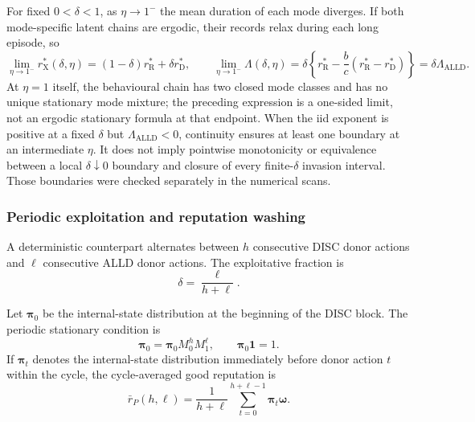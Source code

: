 \documentclass[fleqn,10pt]{wlscirep}
\begin{document}
For fixed $0<\delta<1$, as $\eta\to1^{-}$ the mean duration of each mode diverges. If both mode-specific latent chains are ergodic, their records relax during each long episode, so
\begin{equation}
\lim_{\eta\to1^-}r_{\mathrm X}^*(\delta,\eta)
=(1-\delta)r_{\mathrm R}^*+\delta r_{\mathrm D}^*,
\qquad
\lim_{\eta\to1^-}\Lambda(\delta,\eta)
=\delta\left\{r_{\mathrm R}^*-\frac bc(r_{\mathrm R}^*-r_{\mathrm D}^*)\right\}
=\delta\Lambda_{\mathrm{ALLD}}.
\label{eq:si-temporal-persistent-limit}
\end{equation}
At $\eta=1$ itself, the behavioural chain has two closed mode classes and has no unique stationary mode mixture; the preceding expression is a one-sided limit, not an ergodic stationary formula at that endpoint. When the iid exponent is positive at a fixed $\delta$ but $\Lambda_{\mathrm{ALLD}}<0$, continuity ensures at least one boundary at an intermediate $\eta$. It does not imply pointwise monotonicity or equivalence between a local $\delta\downarrow0$ boundary and closure of every finite-$\delta$ invasion interval. Those boundaries were checked separately in the numerical scans.

\subsubsection{Periodic exploitation and reputation washing}

A deterministic counterpart alternates between $h$ consecutive DISC donor actions and $\ell$ consecutive ALLD donor actions.
The exploitative fraction is
\begin{equation}
\delta
=
\frac{\ell}{h+\ell}.
\end{equation}

Let $\boldsymbol{\pi}_0$ be the internal-state distribution at the beginning of the DISC block.
The periodic stationary condition is
\begin{equation}
\boldsymbol{\pi}_0
=
\boldsymbol{\pi}_0
M_0^hM_1^\ell,
\qquad
\boldsymbol{\pi}_0\mathbf{1}=1.
\end{equation}
If $\boldsymbol{\pi}_t$ denotes the internal-state distribution immediately before donor action $t$ within the cycle, the cycle-averaged good reputation is
\begin{equation}
\bar r_P(h,\ell)
=
\frac{1}{h+\ell}
\sum_{t=0}^{h+\ell-1}
\boldsymbol{\pi}_t\boldsymbol{\omega}.
\label{eq:SI_periodic_reputation}
\end{equation}
\end{document}
